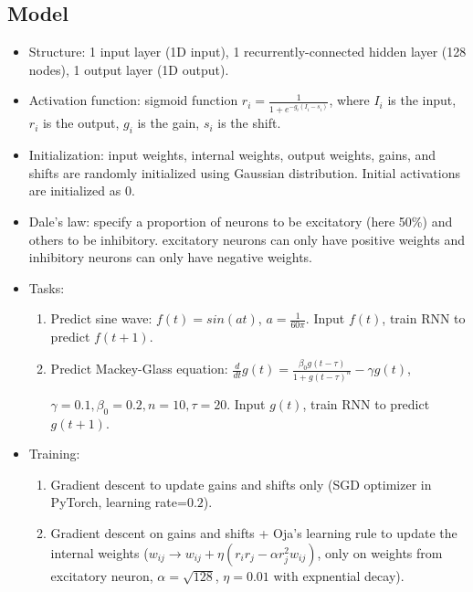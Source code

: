 \documentclass[12pt, a4paper]{article}
\begin{document}
\newpage

\subsection*{Model}
\begin{itemize}
    \item Structure: 1 input layer (1D input), 1 recurrently-connected hidden layer (128 nodes), 1 output layer (1D output).
    \item Activation function: sigmoid function $r_i = \frac{1}{1 + e^{-g_i(I_i-s_i)}}$, where $I_i$ is the input, $r_i$ is the output, $g_i$ is the gain, $s_i$ is the shift. 
    \item Initialization: input weights, internal weights, output weights, gains, and shifts are randomly initialized using Gaussian distribution. Initial activations are initialized as 0.
    \item Dale's law: specify a proportion of neurons to be excitatory (here 50\%) and others to be inhibitory. excitatory neurons can only have positive weights and inhibitory neurons can only have negative weights.
    \item Tasks:
    \begin{enumerate}
        \item Predict sine wave: $f(t)=sin(at)$, $a=\frac{1}{60\pi}$. Input $f(t)$, train RNN to predict $f(t+1)$.
        \item Predict Mackey-Glass equation: $\frac{d}{dt}g(t)=\frac{\beta_0 g(t-\tau)}{1+g(t-\tau)^n}-\gamma g(t)$, 
        
        $\gamma=0.1, \beta_0=0.2, n=10, \tau=20$. Input $g(t)$, train RNN to predict $g(t+1)$.
    \end{enumerate}
    \item Training: 
    \begin{enumerate}
        \item Gradient descent to update gains and shifts only (SGD optimizer in PyTorch, learning rate=$0.2$).
        \item Gradient descent on gains and shifts + Oja's learning rule to update the internal weights ($w_{ij} \rightarrow w_{ij} + \eta (r_i r_j - \alpha r_j^2 w_{ij})$, only on weights from excitatory neuron, $\alpha = \sqrt{128}$, $\eta=0.01$ with expnential decay).
    \end{enumerate}


\end{itemize}
\end{document}
